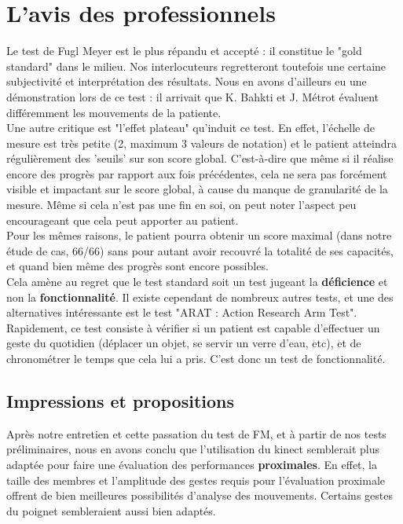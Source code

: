   \section{L'avis des professionnels}
  Le test de Fugl Meyer est le plus répandu et accepté : il constitue le "gold standard" dans le milieu.
  Nos interlocuteurs regretteront toutefois une certaine subjectivité et interprétation des résultats.
  Nous en avons d'ailleurs eu une démonstration lors de ce test : il arrivait que K. Bahkti et J. Métrot 
  évaluent différemment les mouvements de la patiente. \\
Une autre critique est "l'effet plateau" qu'induit ce test. En effet, l'échelle de mesure est très petite 
(2, maximum 3 valeurs de notation) et le patient atteindra régulièrement des 'seuils' sur son score global. 
C'est-à-dire que même si il réalise encore des progrès par rapport aux fois précédentes, cela ne sera pas forcément 
visible et impactant sur le score global, à cause du manque de granularité de la mesure. Même si cela n'est pas une 
fin en soi, on peut noter l'aspect peu encourageant que cela peut apporter au patient. \\
Pour les mêmes raisons, le patient pourra obtenir un score maximal (dans notre étude de cas, 66/66) sans pour autant
avoir recouvré la totalité de ses capacités, et quand bien même des progrès sont encore possibles. \\
Cela amène au regret que le test standard soit un test jugeant la \textbf{déficience} et non la \textbf{fonctionnalité}. 
Il existe cependant de nombreux autres tests, et une des alternatives intéressante est le test "ARAT : 
Action Research Arm Test". %
Rapidement, ce test consiste à vérifier si un patient est capable d'effectuer un geste du quotidien (déplacer
un objet, se servir un verre d'eau, etc), et de chronométrer le temps que cela lui a pris. C'est donc un test 
de fonctionnalité.
  
  \subsection{Impressions et propositions}
Après notre entretien et cette passation du test de FM, et à partir de nos tests préliminaires, nous en avons 
conclu que l'utilisation du kinect semblerait plus adaptée pour faire une évaluation des performances \textbf{proximales}.
En effet, la taille des membres et l'amplitude des gestes requis pour l'évaluation proximale offrent de bien 
meilleures possibilités d'analyse des mouvements. Certains gestes du poignet sembleraient aussi bien adaptés.
